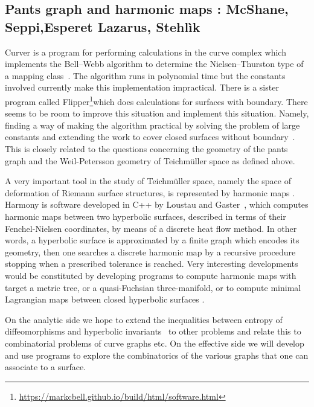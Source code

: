 \documentclass[14pt,fleqn]{article}
\begin{document}
\subsection{Pants graph and harmonic maps
{\normalfont : McShane, Seppi,Esperet Lazarus, 
Stehlìk}
}
\label{curve complex}

Curver is a program for
performing calculations in the curve complex which implements the
Bell–Webb algorithm to determine the Nielsen–Thurston type of a
mapping class~\cite{b-c-17,b-esmt-19}. The algorithm runs in polynomial time but the constants
involved currently make this implementation impractical. There is a
sister program called Flipper\footnote{\url{https://markcbell.github.io/build/html/software.html}}which does calculations for surfaces
with boundary. There seems to be room to improve this situation and
implement this situation. Namely, finding a way of making the
algorithm practical by solving the problem of large constants and
extending the work to cover closed surfaces without boundary~\cite{mm-sosr-19}.
This is closely related to the questions 
concerning the geometry 
of the pants graph and the Weil-Petersson geometry of Teichm\"uller space
as defined above.

A very important tool in the study of Teichm\" {u}ller space, namely the
space of deformation of Riemann surface structures, is represented by
harmonic maps 
\cite{wolf} \cite{kajigaya2019uniformizing}. Harmony is  software developed in C++ by
Loustau and Gaster~\cite{glm-cdehm-18}, which computes harmonic maps between two
hyperbolic surfaces, 
described in terms of their Fenchel-Nielsen
coordinates, 
by means of a discrete heat flow method. In other words,
a hyperbolic surface is 
approximated by a finite graph 
which encodes its geometry, 
then one searches a discrete harmonic 
map by a  recursive procedure 
stopping when  a prescribed tolerance is reached. 
Very interesting developments would be
constituted by developing programs to compute harmonic maps with
target a metric tree, 
or a quasi-Fuchsian three-manifold, or to
compute minimal Lagrangian maps between closed hyperbolic surfaces \cite{BS}.


On the analytic side we hope to extend the
inequalities between entropy of diffeomorphisms and hyperbolic
invariants~\cite{km-nevvp-18} to other problems and relate this to combinatorial problems
of curve graphs etc. On the effective side we will develop and use
programs to explore the combinatorics of the various graphs that one
can associate to a surface.
\end{document}
